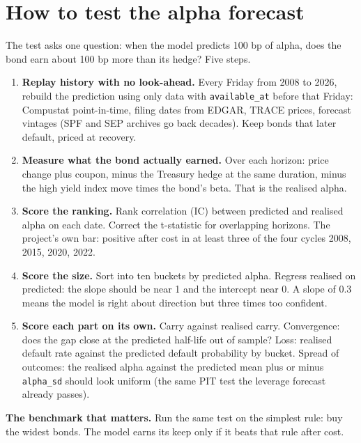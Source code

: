 \documentclass[11pt,a4paper]{article}
\newcommand{\code}[1]{\texttt{\small #1}}
\begin{document}
\section{How to test the alpha forecast}
The test asks one question: when the model predicts 100 bp of alpha, does the bond earn about 100 bp more than its hedge? Five steps.
\begin{enumerate}
\item \textbf{Replay history with no look-ahead.} Every Friday from 2008 to 2026, rebuild the prediction using only data with \code{available\_at} before that Friday: Compustat point-in-time, filing dates from EDGAR, TRACE prices, forecast vintages (SPF and SEP archives go back decades). Keep bonds that later default, priced at recovery.
\item \textbf{Measure what the bond actually earned.} Over each horizon: price change plus coupon, minus the Treasury hedge at the same duration, minus the high yield index move times the bond's beta. That is the realised alpha.
\item \textbf{Score the ranking.} Rank correlation (IC) between predicted and realised alpha on each date. Correct the t-statistic for overlapping horizons. The project's own bar: positive after cost in at least three of the four cycles 2008, 2015, 2020, 2022.
\item \textbf{Score the size.} Sort into ten buckets by predicted alpha. Regress realised on predicted: the slope should be near 1 and the intercept near 0. A slope of 0.3 means the model is right about direction but three times too confident.
\item \textbf{Score each part on its own.} Carry against realised carry. Convergence: does the gap close at the predicted half-life out of sample? Loss: realised default rate against the predicted default probability by bucket. Spread of outcomes: the realised alpha against the predicted mean plus or minus \code{alpha\_sd} should look uniform (the same PIT test the leverage forecast already passes).
\end{enumerate}
\textbf{The benchmark that matters.} Run the same test on the simplest rule: buy the widest bonds. The model earns its keep only if it beats that rule after cost.
\end{document}
